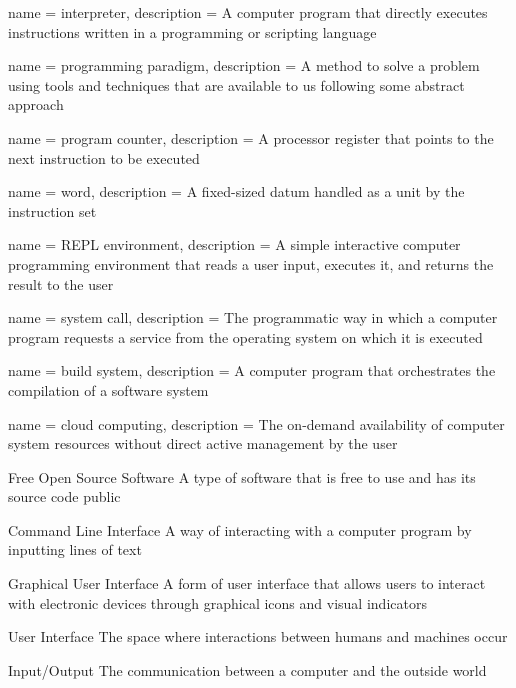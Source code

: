  {
  name = {interpreter},
  description = {A computer program that directly executes instructions written in a programming or scripting language}
}

 {
  name = {programming paradigm},
  description = {A method to solve a problem using tools and techniques that are available to us following some abstract approach}
}

 {
  name = {program counter},
  description = {A processor register that points to the next instruction to be executed}
}

 {
  name = {word},
  description = {A fixed-sized datum handled as a unit by the instruction set}
}

 {
  name = {REPL environment},
  description = {A simple interactive computer programming environment that reads a user input, executes it, and returns the result to the user}
}

 {
  name = {system call},
  description = {The programmatic way in which a computer program requests a service from the operating system on which it is executed}
}

 {
  name = {build system},
  description = {A computer program that orchestrates the compilation of a software system}
}

 {
  name = {cloud computing},
  description = {The on-demand availability of computer system resources without direct active management by the user}
}


{Free Open Source Software}
{A type of software that is free to use and has its source code public}

{Command Line Interface}
{A way of interacting with a computer program by inputting lines of text}

{Graphical User Interface}
{A form of user interface that allows users to interact with electronic devices through graphical icons and visual indicators}

{User Interface}
{The space where interactions between humans and machines occur}


{Input/Output}
{The communication between a computer and the outside world}

